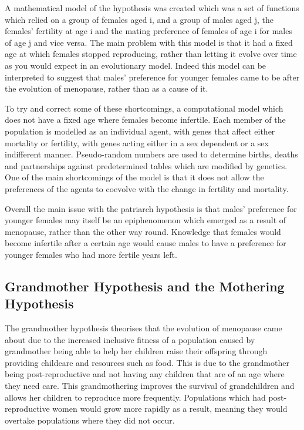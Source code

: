 \documentclass[authoryearcitations]{UoYCSproject}
\begin{document}
A mathematical model of the hypothesis was created \cite{whyMenMatter2007} which was a set of functions which relied on a group of females aged i, and a group of males aged j, the females' fertility at age i and the mating preference of females of age i for males of age j and vice versa. The main problem with this model is that it had a fixed age at which females stopped reproducing, rather than letting it evolve over time as you would expect in an evolutionary model. Indeed this model can be interpreted to suggest that males' preference for younger females came to be after the evolution of menopause, rather than as a cause of it.

To try and correct some of these shortcomings, a computational model \cite{mateChoice2013} which does not have a fixed age where females become infertile. Each member of the population is modelled as an individual agent, with genes that affect either mortality or fertility, with genes acting either in a sex dependent or a sex indifferent manner. Pseudo-random numbers are used to determine births, deaths and partnerships against predetermined tables which are modified by genetics. One of the main shortcomings of the model is that it does not allow the preferences of the agents to coevolve with the change in fertility and mortality. 

Overall the main issue with the patriarch hypothesis is that males' preference for younger females may itself be an epiphenomenon which emerged as a result of menopause, rather than the other way round. Knowledge that females would become infertile after a certain age would cause males to have a preference for younger females who had more fertile years left.

\subsection{Grandmother Hypothesis and the Mothering Hypothesis}
The grandmother hypothesis \cite{grandmother2000, grandmotheringProbabilistic2014, longevityGrandmother2012} theorises that the evolution of menopause came about due to the increased inclusive fitness of a population caused by grandmother being able to help her children raise their offspring through providing childcare and resources such as food. This is due to the grandmother being post-reproductive and not having any children that are of an age where they need care. This grandmothering improves the survival of grandchildren and allows her children to reproduce more frequently. Populations which had post-reproductive women would grow more rapidly as a result, meaning they would overtake populations where they did not occur. 
\end{document}
